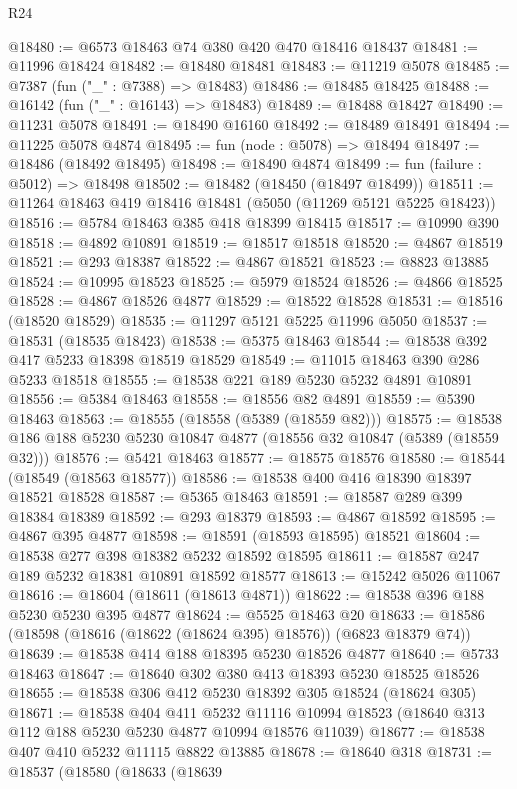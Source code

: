 \begin{lexlean}{R24}
\begin{coremodule}
@18480 := @6573 @18463 @74 @380 @420 @470 @18416 @18437
@18481 := @11996 @18424
@18482 := @18480 @18481
@18483 := @11219 @5078
@18485 := @7387 (fun ("_" : @7388) => @18483)
@18486 := @18485 @18425
@18488 := @16142 (fun ("_" : @16143) => @18483)
@18489 := @18488 @18427
@18490 := @11231 @5078
@18491 := @18490 @16160
@18492 := @18489 @18491
@18494 := @11225 @5078 @4874
@18495 := fun (node : @5078) => @18494
@18497 := @18486 (@18492 @18495)
@18498 := @18490 @4874
@18499 := fun (failure : @5012) => @18498
@18502 := @18482 (@18450 (@18497 @18499))
@18511 := @11264 @18463 @419 @18416 @18481 (@5050 (@11269 @5121 @5225 @18423))
@18516 := @5784 @18463 @385 @418 @18399 @18415
@18517 := @10990 @390
@18518 := @4892 @10891
@18519 := @18517 @18518
@18520 := @4867 @18519
@18521 := @293 @18387
@18522 := @4867 @18521
@18523 := @8823 @13885
@18524 := @10995 @18523
@18525 := @5979 @18524
@18526 := @4866 @18525
@18528 := @4867 @18526 @4877
@18529 := @18522 @18528
@18531 := @18516 (@18520 @18529)
@18535 := @11297 @5121 @5225 @11996 @5050
@18537 := @18531 (@18535 @18423)
@18538 := @5375 @18463
@18544 := @18538 @392 @417 @5233 @18398 @18519 @18529
@18549 := @11015 @18463 @390 @286 @5233 @18518
@18555 := @18538 @221 @189 @5230 @5232 @4891 @10891
@18556 := @5384 @18463
@18558 := @18556 @82 @4891
@18559 := @5390 @18463
@18563 := @18555 (@18558 (@5389 (@18559 @82)))
@18575 := @18538 @186 @188 @5230 @5230 @10847 @4877 (@18556 @32 @10847 (@5389 (@18559 @32)))
@18576 := @5421 @18463
@18577 := @18575 @18576
@18580 := @18544 (@18549 (@18563 @18577))
@18586 := @18538 @400 @416 @18390 @18397 @18521 @18528
@18587 := @5365 @18463
@18591 := @18587 @289 @399 @18384 @18389
@18592 := @293 @18379
@18593 := @4867 @18592
@18595 := @4867 @395 @4877
@18598 := @18591 (@18593 @18595) @18521
@18604 := @18538 @277 @398 @18382 @5232 @18592 @18595
@18611 := @18587 @247 @189 @5232 @18381 @10891 @18592 @18577
@18613 := @15242 @5026 @11067
@18616 := @18604 (@18611 (@18613 @4871))
@18622 := @18538 @396 @188 @5230 @5230 @395 @4877
@18624 := @5525 @18463 @20
@18633 := @18586 (@18598 (@18616 (@18622 (@18624 @395) @18576)) (@6823 @18379 @74))
@18639 := @18538 @414 @188 @18395 @5230 @18526 @4877
@18640 := @5733 @18463
@18647 := @18640 @302 @380 @413 @18393 @5230 @18525 @18526
@18655 := @18538 @306 @412 @5230 @18392 @305 @18524 (@18624 @305)
@18671 := @18538
    @404
    @411
    @5232
    @11116
    @10994
    @18523
    (@18640 @313 @112 @188 @5230 @5230 @4877 @10994 @18576 @11039)
@18677 := @18538 @407 @410 @5232 @11115 @8822 @13885
@18678 := @18640 @318
@18731 := @18537
    (@18580
      (@18633
        (@18639

\end{coremodule}
\end{lexlean}
